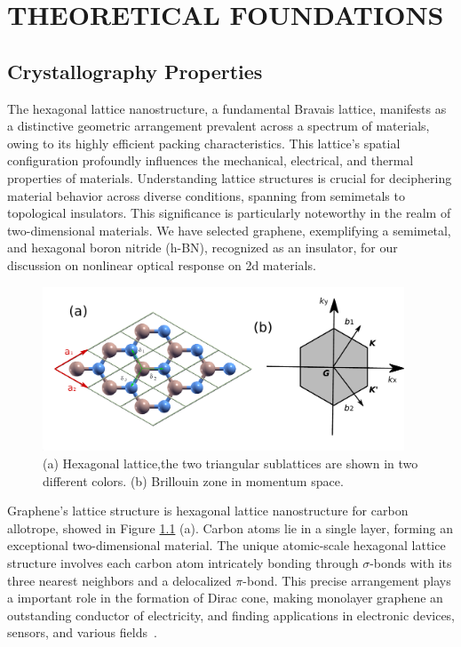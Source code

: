 \chapter{THEORETICAL FOUNDATIONS}
\label{ch:ch2}
\section{Crystallography Properties}
The hexagonal lattice nanostructure, a fundamental Bravais lattice, manifests as a distinctive geometric arrangement prevalent across a spectrum of materials, owing to its highly efficient packing characteristics. This lattice's spatial configuration profoundly influences the mechanical, electrical, and thermal properties of materials. Understanding lattice structures is crucial for deciphering material behavior across diverse conditions, spanning from semimetals to topological insulators. This significance is particularly noteworthy in the realm of two-dimensional materials. We have selected graphene, exemplifying a semimetal, and hexagonal boron nitride (h-BN), recognized as an insulator, for our discussion on nonlinear optical response on 2d materials.\\
\begin{figure}[htpb]
	\centering
	\includegraphics[width=0.96\textwidth]{pic/lattice.pdf}
	\caption[Lab coordinate system]{(a) Hexagonal lattice,the two triangular sublattices are shown
		in two different colors. (b) Brillouin zone in momentum space.}
	\label{fig: lattice}
\end{figure}
Graphene's lattice structure is hexagonal lattice nanostructure for carbon allotrope, showed in Figure \ref{fig: lattice} (a). Carbon atoms
lie in a single layer, forming an exceptional two-dimensional material. The unique
atomic-scale hexagonal lattice structure involves each carbon atom intricately bonding through
$\sigma$-bonds with its three nearest neighbors and a delocalized $\pi$-bond. This precise
arrangement plays a important role in the formation of Dirac cone, making monolayer graphene an outstanding conductor of electricity, and
finding applications in electronic devices, sensors, and various fields~\cite{sarma2011electronic}.

